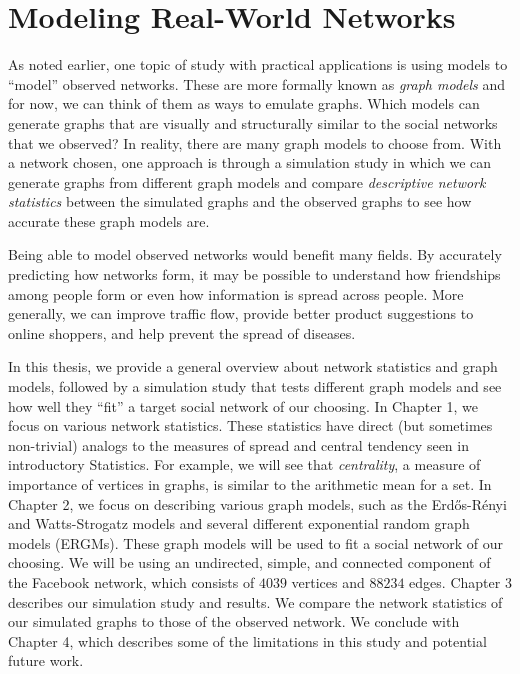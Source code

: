 \documentclass[12pt,twoside]{amherstthesis}
\begin{document}
  \section{Modeling Real-World
  Networks}\label{modeling-real-world-networks}
  
  As noted earlier, one topic of study with practical applications is
  using models to ``model'' observed networks. These are more formally
  known as \emph{graph models} and for now, we can think of them as ways
  to emulate graphs. Which models can generate graphs that are visually
  and structurally similar to the social networks that we observed? In
  reality, there are many graph models to choose from. With a network
  chosen, one approach is through a simulation study in which we can
  generate graphs from different graph models and compare
  \emph{descriptive network statistics} between the simulated graphs and
  the observed graphs to see how accurate these graph models are.
  
  Being able to model observed networks would benefit many fields. By
  accurately predicting how networks form, it may be possible to
  understand how friendships among people form or even how information is
  spread across people. More generally, we can improve traffic flow,
  provide better product suggestions to online shoppers, and help prevent
  the spread of diseases.
  
  In this thesis, we provide a general overview about network statistics
  and graph models, followed by a simulation study that tests different
  graph models and see how well they ``fit'' a target social network of
  our choosing. In Chapter 1, we focus on various network statistics.
  These statistics have direct (but sometimes non-trivial) analogs to the
  measures of spread and central tendency seen in introductory Statistics.
  For example, we will see that \emph{centrality}, a measure of importance
  of vertices in graphs, is similar to the arithmetic mean for a set. In
  Chapter 2, we focus on describing various graph models, such as the
  Erdős-Rényi and Watts-Strogatz models and several different exponential
  random graph models (ERGMs). These graph models will be used to fit a
  social network of our choosing. We will be using an undirected, simple,
  and connected component of the Facebook network, which consists of
  \(4039\) vertices and \(88234\) edges. Chapter 3 describes our
  simulation study and results. We compare the network statistics of our
  simulated graphs to those of the observed network. We conclude with
  Chapter 4, which describes some of the limitations in this study and
  potential future work.
  
\end{document}
